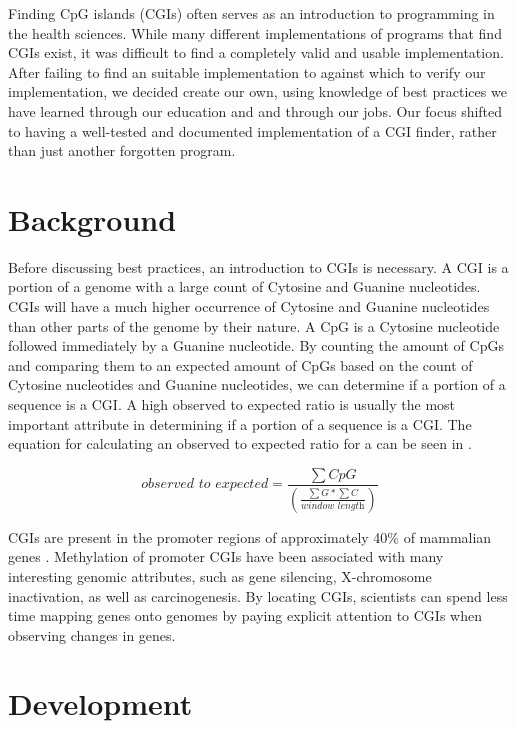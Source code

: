 \documentclass{bioinfo}
\begin{document}
Finding CpG islands (CGIs) often serves as an introduction to
programming in the health sciences. While many different
implementations of programs that find CGIs exist, it was difficult to
find a completely valid and usable implementation. After failing to
find an suitable implementation to against which to verify our
implementation, we decided create our own, using knowledge of best
practices we have learned through our education and and through our
jobs. Our focus shifted to having a well-tested and documented
implementation of a CGI finder, rather than just another forgotten
program.
    
\section{Background}

Before discussing best practices, an introduction to CGIs is
necessary. A CGI is a portion of a genome with a large count of
Cytosine and Guanine nucleotides. CGIs will have a much higher
occurrence of Cytosine and Guanine nucleotides than other parts of the
genome by their nature. A CpG is a Cytosine nucleotide followed
immediately by a Guanine nucleotide. By counting the amount of CpGs
and comparing them to an expected amount of CpGs based on the count of
Cytosine nucleotides and Guanine nucleotides, we can determine if a
portion of a sequence is a CGI. A high observed to expected ratio is
usually the most important attribute in determining if a portion of a
sequence is a CGI. The equation for calculating an observed to
expected ratio for a can be seen in .

\begin{equation}
    \textit{observed to expected} = \frac{\sum CpG}{(\frac{\sum G * \sum C}{\textit{window length}})} \label{eq:01}
\end{equation}
      
CGIs are present in the promoter regions of approximately 40\% of
mammalian genes \citep{pmid11891299}. Methylation of promoter CGIs
have been associated with many interesting genomic attributes, such as
gene silencing, X-chromosome inactivation, as well as
carcinogenesis. By locating CGIs, scientists can spend less time
mapping genes onto genomes by paying explicit attention to CGIs when
observing changes in genes.

\section{Development}
\end{document}
